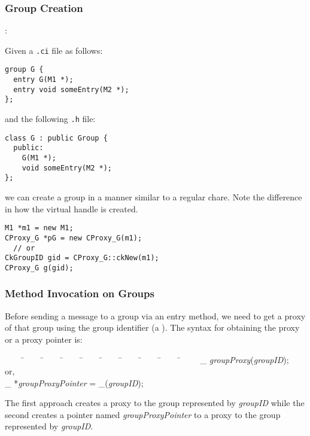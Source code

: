 \subsubsection{Group Creation}

:

\noindent Given a {\tt .ci} file as follows:

\begin{verbatim}
group G {
  entry G(M1 *);
  entry void someEntry(M2 *);
};
\end{verbatim}

\noindent and the following {\tt .h} file:

\begin{verbatim}
class G : public Group {
  public:
    G(M1 *);
    void someEntry(M2 *);
};
\end{verbatim}

we can create a group in a manner similar to a regular chare.  Note
the difference in how the virtual handle is created.

\begin{verbatim}
M1 *m1 = new M1;
CProxy_G *pG = new CProxy_G(m1);
  // or
CkGroupID gid = CProxy_G::ckNew(m1);
CProxy_G g(gid);
\end{verbatim}

\subsubsection{Method Invocation on Groups}

Before sending a message to a group via an entry
method, we need to get a proxy of that group using the group identifier (a
). The syntax for obtaining the proxy or a proxy
pointer is:

\begin{tabbing} ~~~~ \=~~~~ \=~~~~ \=~~~~ \=~~~~ \=~~~~ \=~~~~ \=~~~~ \=~~~~
\=~~~~ \kill \> \_ {\it groupProxy}({\it groupID}); \\
\> \> or, \\ \> \_ *{\it groupProxyPointer} = \_({\it groupID}); \end{tabbing}

The first approach creates a proxy to the group represented by {\it groupID}
while the second creates a pointer named {\it groupProxyPointer} to a proxy to
the group represented by {\it groupID}. 

